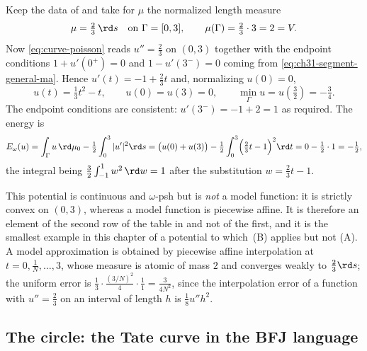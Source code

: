 \begin{example}
\label{ex:ch31-chain-lebesgue}
Keep the data of  and take for \(\mu\) the
normalized length measure
\[
 \mu=\tfrac23\,\rd s\quad\text{on }\Gamma=[0,3],
 \qquad \mu(\Gamma)=\tfrac23\cdot3=2=V .
\]
Now \eqref{eq:curve-poisson} reads \(u''=\tfrac23\) on \((0,3)\) together
with the endpoint conditions \(1+u'(0^+)=0\) and \(1-u'(3^-)=0\) coming from
\eqref{eq:ch31-segment-general-ma}.  Hence \(u'(t)=-1+\tfrac23t\) and,
normalizing \(u(0)=0\),
\begin{equation}
\label{eq:ch31-chain-lebesgue-potential}
 u(t)=\tfrac13t^2-t,
 \qquad u(0)=u(3)=0,
 \qquad \min_\Gamma u=u(\tfrac32)=-\tfrac34 .
\end{equation}
The endpoint conditions are consistent: \(u'(3^-)=-1+2=1\) as required.  The
energy is
\[
 E_\omega(u)=\int_\Gamma u\,\rd\mu_0-\tfrac12\int_0^3|u'|^2\rd s
 =\bigl(u(0)+u(3)\bigr)-\tfrac12\int_0^3\Bigl(\tfrac23t-1\Bigr)^2\rd t
 =0-\tfrac12\cdot1=-\tfrac12 ,
\]
the integral being \(\tfrac32\int_{-1}^{1}w^2\,\rd w=1\) after the
substitution \(w=\tfrac23t-1\).

This potential is continuous and \(\omega\)-psh but is \emph{not} a model
function: it is strictly convex on \((0,3)\), whereas a model function is
piecewise affine.  It is therefore an element of the second row of the table
in  and not of the first, and it is the
smallest example in this chapter of a potential to which
\,(B) applies but not (A).  A model
approximation is obtained by piecewise affine interpolation at
\(t=0,\tfrac1N,\ldots,3\), whose measure is atomic of mass \(2\) and
converges weakly to \(\tfrac23\rd s\); the uniform error is
\(\tfrac13\cdot\tfrac{(3/N)^2}{4}\cdot\tfrac{1}{1}=\tfrac{3}{4N^2}\), since
the interpolation error of a function with \(u''=\tfrac23\) on an interval
of length \(h\) is \(\tfrac{1}{8}u''h^2\).
\end{example}

\subsection{The circle: the Tate curve in the BFJ language}
\label{sec:ch31-circle}


